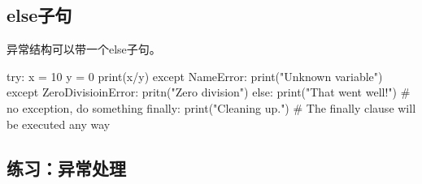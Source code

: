 \subsection{else子句}
异常结构可以带一个else子句。
\begin{python}
try:
    x = 10
    y = 0
    print(x/y)
except NameError:
    print("Unknown variable")
except ZeroDivisioinError:
    pritn("Zero division")
else:
    print("That went well!")  # no exception, do something
finally:
    print("Cleaning up.")     # The finally clause will be executed any way
\end{python}

\subsection{练习：异常处理}




